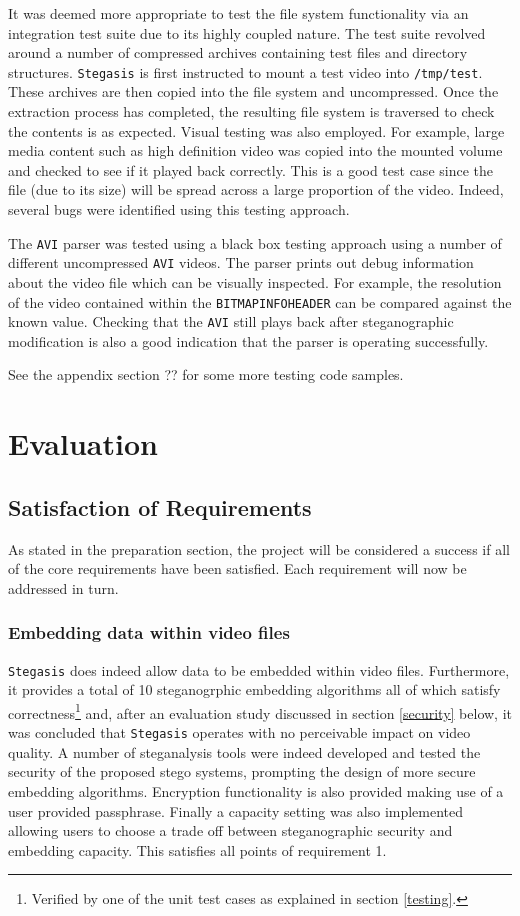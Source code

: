 \documentclass[paper=a4, fontsize=11pt,twoside]{scrartcl}    %
\numberwithin{table}{section}
\numberwithin{figure}{section}
\numberwithin{algorithm}{section}
\begin{document}
It was deemed more appropriate to test the file system functionality via an integration test suite due to its highly coupled nature. The test suite revolved around a number of compressed archives containing test files and directory structures. \texttt{Stegasis} is first instructed to mount a test video into \texttt{/tmp/test}. These archives are then copied into the file system and uncompressed. Once the extraction process has completed, the resulting file system is traversed to check the contents is as expected. Visual testing was also employed. For example, large media content such as high definition video was copied into the mounted volume and checked to see if it played back correctly. This is a good test case since the file (due to its size) will be spread across a large proportion of the video. Indeed, several bugs were identified using this testing approach.

The \texttt{AVI} parser was tested using a black box testing approach using a number of different uncompressed \texttt{AVI} videos. The parser prints out debug information about the video file which can be visually inspected. For example, the resolution of the video contained within the \texttt{BITMAPINFOHEADER} can be compared against the known value. Checking that the \texttt{AVI} still plays back after steganographic modification is also a good indication that the parser is operating successfully.

See the appendix section ?? for some more testing code samples. 

\section{Evaluation}
\subsection{Satisfaction of Requirements}

As stated in the preparation section, the project will be considered a success if all of the core requirements have been satisfied. Each requirement will now be addressed in turn.

\subsubsection{Embedding data within video files}

\texttt{Stegasis} does indeed allow data to be embedded within video files. Furthermore, it provides a total of 10 steganogrphic embedding algorithms all of which satisfy correctness\footnote{Verified by one of the unit test cases as explained in section \ref{testing}.} and, after an evaluation study discussed in section \ref{security} below, it was concluded that \texttt{Stegasis} operates with no perceivable impact on video quality. A number of steganalysis tools were indeed developed and tested the security of the proposed stego systems, prompting the design of more secure embedding algorithms. Encryption functionality is also provided making use of a user provided passphrase. Finally a capacity setting was also implemented allowing users to choose a trade off between steganographic security and embedding capacity. This satisfies all points of requirement 1.
\end{document}
